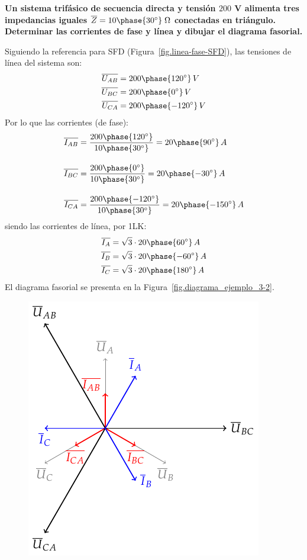 	\vspace{4mm}
    \begin{example}\label{ej.3-2}
	    \textbf{Un sistema trifásico de secuencia directa y tensión $200$ V alimenta tres impedancias iguales $\overline{Z}=10\phase{30^\circ}\;\Omega$ conectadas en triángulo. Determinar las corrientes de fase y línea y dibujar el diagrama fasorial.}
	    
	    Siguiendo la referencia para SFD (Figura~\ref{fig.linea-fase-SFD}), las tensiones de línea del sistema son:
	    \begin{align*}
	        \overline{U_{AB}}&=200\phase{120^\circ}\,V\\
	        \overline{U_{BC}}&=200\phase{0^\circ}\,V\\
	        \overline{U_{CA}}&=200\phase{-120^\circ}\,V
	    \end{align*}
	    Por lo que las corrientes (de fase):
	    \begin{align*}
	        \overline{I_{AB}} &= \frac{200\phase{120^\circ}}{10\phase{30^\circ}} =20\phase{90^\circ} \,A \\[10pt]
          \overline{I_{BC}} &= \frac{200\phase{0^\circ}}{10\phase{30^\circ}} = 20\phase{-30^\circ} \,A\\[10pt]
          \overline{I_{CA}} &=\frac{200\phase{-120^\circ}}{10\phase{30^\circ}} = 20\phase{-150^\circ} \,A
	    \end{align*}
	    siendo las corrientes de línea, por 1LK:
	    \begin{align*}
	        \overline{I_A}&=\sqrt{3}\cdot 20\phase{60^\circ}\,A\\
	        \overline{I_B}&=\sqrt{3}\cdot 20\phase{-60^\circ}\,A\\
	        \overline{I_C}&=\sqrt{3}\cdot 20\phase{180^\circ}\,A
	    \end{align*}
	    El diagrama fasorial se presenta en la Figura~\ref{fig.diagrama_ejemplo_3-2}. 
	    \begin{figure}[H]
	        \centering
	    \includegraphics{../figs/diagrama_ejemplo3_2.pdf}

\end{figure}
\end{example}
